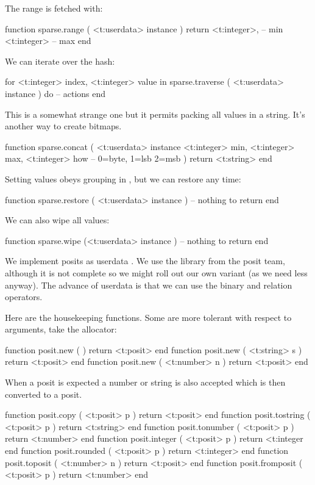 The range is fetched with:

\starttyping[option=LUA]
function sparse.range ( <t:userdata> instance )
    return
        <t:integer>, -- min
        <t:integer>  -- max
end
\stoptyping

We can iterate over the hash:

\starttyping[option=LUA]
for
    <t:integer> index,
    <t:integer> value
in sparse.traverse (
    <t:userdata> instance
) do
    -- actions
end
\stoptyping

This is a somewhat strange one but it permits packing all values in a string.
It's another way to create bitmaps.

\starttyping[option=LUA]
function sparse.concat (
    <t:userdata> instance
    <t:integer>  min,
    <t:integer>  max,
    <t:integer>  how  -- 0=byte, 1=lsb 2=msb
)
    return <t:string>
end
\stoptyping

Setting values obeys grouping in \TEX, but we can restore any time:

\starttyping[option=LUA]
function sparse.restore ( <t:userdata> instance )
    -- nothing to return
end
\stoptyping

We can also wipe all values:

\starttyping[option=LUA]
function sparse.wipe (<t:userdata> instance )
    -- nothing to return
end
\stoptyping

\stopsubsection

\startsubsection[title=Posits]

We implement posits as userdata . We use the library from the posit team,
although it is not complete so we might roll out our own variant (as we need less
anyway). The advance of userdata is that we can use the binary and relation
operators.

Here are the housekeeping functions. Some are more tolerant with respect to
arguments, take the allocator:

\starttyping[option=LUA]
function posit.new (              ) return <t:posit> end
function posit.new ( <t:string> s ) return <t:posit> end
function posit.new ( <t:number> n ) return <t:posit> end
\stoptyping

When a posit is expected a number or string is also accepted which is then
converted to a posit.

\starttyping[option=LUA]
function posit.copy      ( <t:posit>  p ) return <t:posit>   end
function posit.tostring  ( <t:posit>  p ) return <t:string>  end
function posit.tonumber  ( <t:posit>  p ) return <t:number>  end
function posit.integer   ( <t:posit>  p ) return <t:integer  end
function posit.rounded   ( <t:posit>  p ) return <t:integer> end
function posit.toposit   ( <t:number> n ) return <t:posit>   end
function posit.fromposit ( <t:posit>  p ) return <t:number>  end
\stoptyping

